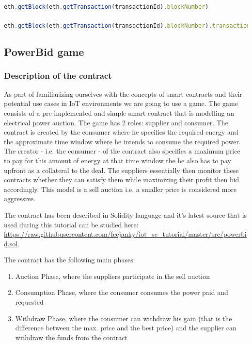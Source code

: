 \documentclass[a4paper]{article}
\begin{document}
\begin{lstlisting}[language=javascript,caption={Functions for analyzing a block},label={lst:block}]
eth.getBlock(eth.getTransaction(transactionId).blockNumber)

eth.getBlock(eth.getTransaction(transactionId).blockNumber).transactions.map(function(tx){return eth.getTransaction(tx);})
\end{lstlisting}

\subsection{PowerBid game}

\subsubsection{Description of the contract}
As part of familiarizing ourselves with the concepts of smart contracts and their potential use cases in IoT environments we are going to use a game. The game consists of a pre-implemented and simple smart contract that is modelling an electrical power auction. The game has 2 roles: supplier and consumer. The contract is created by the consumer where he specifies the required energy and the approximate time window where he intends to consume the required power. The creator - i.e. the consumer - of the contract also specifies a maximum price to pay for this amount of energy at that time window the he also has to pay upfront as a collateral to the deal. The suppliers essentially then monitor these contracts whether they can satisfy them while maximizing their profit then bid accordingly. This model is a sell auction i.e. a smaller price is considered more aggressive. 

The contract has been described in Solidity language and it's latest source that is used during this tutorial can be studied here: \url{https://raw.githubusercontent.com/fecjanky/iot_sc_tutorial/master/src/powerbid.sol}.

The contract has the following main phases:
\begin{enumerate}
    \item Auction Phase, where the suppliers participate in the sell auction
    \item Consumption Phase, where the consumer consumes the power paid and requested
    \item Withdraw Phase, where the consumer can withdraw his gain (that is the difference between the max. price and the best price) and the supplier can withdraw the funds from the contract
\end{enumerate}
\end{document}

